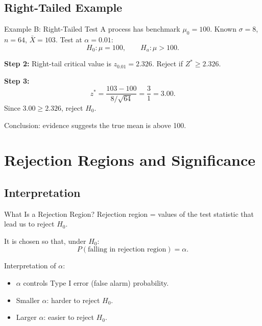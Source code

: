 \documentclass[aspectratio=169]{beamer}
\begin{document}
\subsection{Right-Tailed Example}
\begin{frame}{Example B: Right-Tailed Test}
  A process has benchmark \(\mu_0=100\).
  Known \(\sigma=8\), \(n=64\), \(\bar X=103\).
  Test at \(\alpha=0.01\):
  \[
    H_0:\mu=100,\qquad H_a:\mu>100.
  \]

  \vspace{1mm}
  \textbf{Step 2:} Right-tail critical value is \(z_{0.01}=2.326\).
  Reject if \(Z^*\ge 2.326\).

  \vspace{1mm}
  \textbf{Step 3:}
  \[
    z^*=\frac{103-100}{8/\sqrt{64}}=\frac{3}{1}=3.00.
  \]
  Since \(3.00\ge 2.326\), reject \(H_0\).

  \vspace{1mm}
  Conclusion: evidence suggests the true mean is above 100.
\end{frame}

\section{Rejection Regions and Significance}

\subsection{Interpretation}
\begin{frame}{What Is a Rejection Region?}
  Rejection region = values of the test statistic that lead us to reject \(H_0\).

  \vspace{2mm}
  It is chosen so that, under \(H_0\):
  \[
    P(\text{falling in rejection region})=\alpha.
  \]

  \vspace{1mm}
  Interpretation of \(\alpha\):
  \begin{itemize}
    \item \(\alpha\) controls Type I error (false alarm) probability.
    \item Smaller \(\alpha\): harder to reject \(H_0\).
    \item Larger \(\alpha\): easier to reject \(H_0\).
  \end{itemize}
\end{frame}
\end{document}
